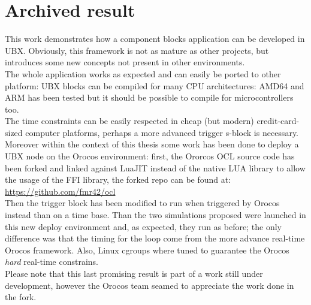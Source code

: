 \chapter{Archived result}
\label{ch:archived} 
This work demonstrates how a component blocks application can be developed in UBX. Obviously, this framework is not as mature as other projects, but introduces some new concepts not present in other environments.\\
The whole application works as expected and can easily be ported to other platform: UBX blocks can be compiled for many CPU architectures: AMD64 and ARM has been tested but it should be possible to compile for microcontrollers too.\\
The time constraints can be easily respected in cheap (but modern) credit-card-sized computer platforms, perhaps a more advanced trigger s-block is necessary.\\
Moreover	 within the context of this thesis some work has been done to deploy a UBX node on the Orocos environment: first, the Ororcos OCL source code has been forked and linked against LuaJIT instead of the native LUA library to allow the usage of the FFI library, the forked repo can be found at:\\
\url{https://github.com/fmr42/ocl}\\
Then the trigger block has been modified to run when triggered by Orocos instead than on a time base. Than the two simulations proposed were launched in this new deploy environment and, as expected, they run as before; the only difference was that the timing for the loop come from the more advance real-time Orocos framework. Also, Linux cgroups where tuned to guarantee the Orocos \emph{hard} real-time constrains.\\
Please note that this last promising result is part of a work still under development, however the Orocos team seamed to appreciate the work done in the fork.